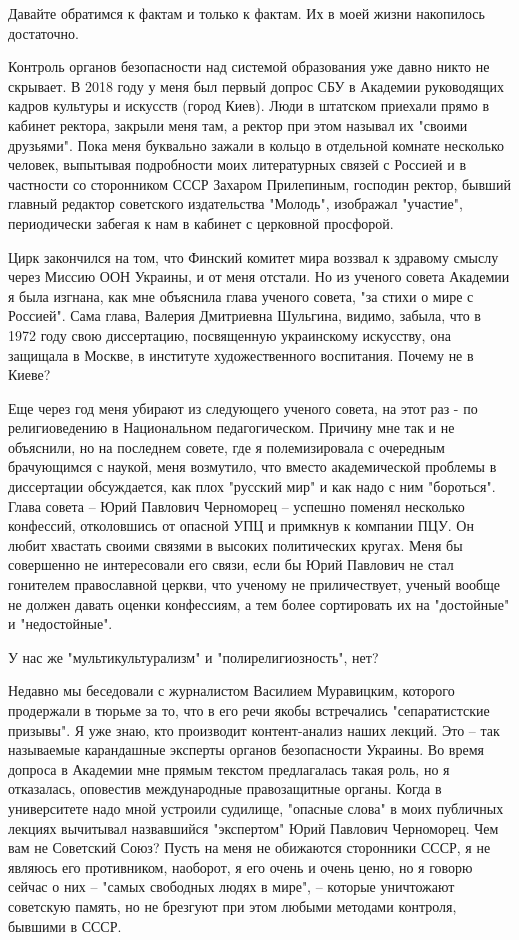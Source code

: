 Давайте обратимся к фактам и только к фактам. Их в моей жизни накопилось
достаточно.

Контроль органов безопасности над системой образования уже давно никто не
скрывает. В 2018 году у меня был первый допрос СБУ в Академии руководящих
кадров культуры и искусств (город Киев). Люди в штатском приехали прямо в
кабинет ректора, закрыли меня там, а ректор при этом называл их "своими
друзьями". Пока меня буквально зажали в кольцо в отдельной комнате несколько
человек, выпытывая подробности моих литературных связей с Россией и в частности
со сторонником СССР Захаром Прилепиным, господин ректор, бывший главный
редактор советского издательства "Молодь", изображал "участие", периодически
забегая к нам в кабинет с церковной просфорой.

Цирк закончился на том, что Финский комитет мира воззвал к здравому смыслу
через Миссию ООН Украины, и от меня отстали. Но из ученого совета Академии я
была изгнана, как мне объяснила глава ученого совета, "за стихи о мире с
Россией". Сама глава, Валерия Дмитриевна Шульгина, видимо, забыла, что в 1972
году свою диссертацию, посвященную украинскому искусству, она защищала в
Москве, в институте художественного воспитания. Почему не в Киеве?

Еще через год меня убирают из следующего ученого совета, на этот раз - по
религиоведению в Национальном педагогическом. Причину мне так и не объяснили,
но на последнем совете, где я полемизировала с очередным брачующимся с наукой,
меня возмутило, что вместо академической проблемы в диссертации обсуждается,
как плох "русский мир" и как надо с ним "бороться". Глава совета – Юрий
Павлович Черноморец – успешно поменял несколько конфессий, отколовшись от
опасной УПЦ и примкнув к компании ПЦУ. Он любит хвастать своими связями в
высоких политических кругах. Меня бы совершенно не интересовали его связи, если
бы Юрий Павлович не стал гонителем православной церкви, что ученому не
приличествует, ученый вообще не должен давать оценки конфессиям, а тем более
сортировать их на "достойные" и "недостойные".

У нас же "мультикультурализм" и "полирелигиозность", нет?

Недавно мы беседовали с журналистом Василием Муравицким, которого продержали в
тюрьме за то, что в его речи якобы встречались "сепаратистские призывы". Я уже
знаю, кто производит контент-анализ наших лекций. Это – так называемые
карандашные эксперты органов безопасности Украины. Во время допроса в Академии
мне прямым текстом предлагалась такая роль, но я отказалась, оповестив
международные правозащитные органы. Когда в университете надо мной устроили
судилище, "опасные слова" в моих публичных лекциях вычитывал назвавшийся
"экспертом" Юрий Павлович Черноморец. Чем вам не Советский Союз? Пусть на меня
не обижаются сторонники СССР, я не являюсь его противником, наоборот, я его
очень и очень ценю, но я говорю сейчас о них – "самых свободных людях в мире",
– которые уничтожают советскую память, но не брезгуют при этом любыми методами
контроля, бывшими в СССР.

